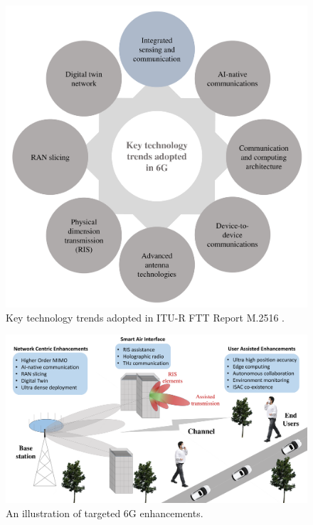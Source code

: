 \documentclass[journal, comsoc]{IEEEtran}
\begin{document}
\begin{figure}[t!]
    \begin{center}    %
        \includegraphics[width=0.9\linewidth]{Figures/ITU_ISAC2.pdf}
    \end{center}
    \setlength{\belowcaptionskip}{-2pt}%
    \caption{Key technology trends adopted in ITU-R FTT Report M.2516 \cite{itur}.}
    \vspace{-3mm}
    \label{fig1a}
\end{figure}



\begin{figure}[t!]
    \begin{center} 
        \includegraphics[width=0.7\linewidth]{Figures/scene1.pdf}
    \end{center}
    \caption{An illustration of targeted 6G enhancements.}
    \label{fig2a}
    \vspace{-2mm}
\end{figure}
\end{document}
